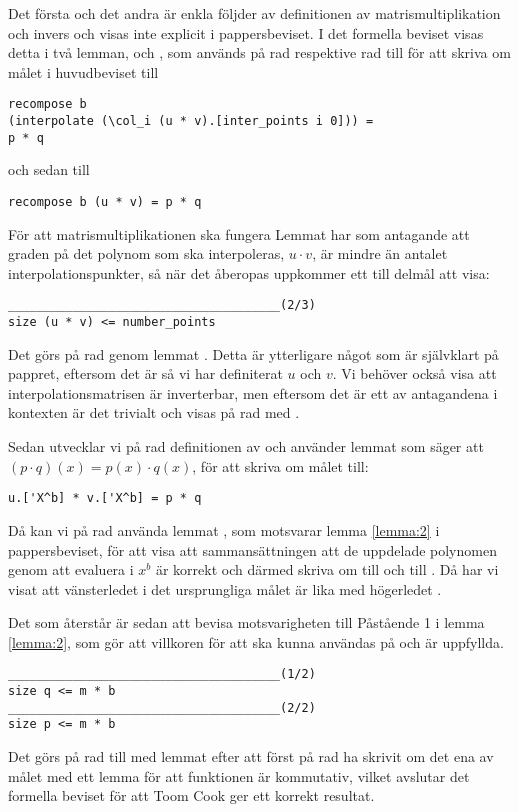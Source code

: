 Det första och det andra är enkla följder av definitionen av
matrismultiplikation och invers och visas inte explicit i pappersbeviset. I det
formella beviset visas detta i två lemman,  och
, som används på rad  respektive rad  till
 för att skriva om målet i huvudbeviset till
\begin{lstlisting}
recompose b
(interpolate (\col_i (u * v).[inter_points i 0])) =
p * q
\end{lstlisting}
och sedan till
\begin{lstlisting}
recompose b (u * v) = p * q
\end{lstlisting}
För att matrismultiplikationen ska fungera Lemmat  har
som antagande att graden på det polynom som ska interpoleras, $u \cdot v$, är
mindre än antalet interpolationspunkter, så när det åberopas uppkommer ett till
delmål att visa:
\begin{lstlisting}
______________________________________(2/3)
size (u * v) <= number_points
\end{lstlisting}
Det görs på rad  genom lemmat . Detta är
ytterligare något som är självklart på pappret, eftersom det är så vi har
definiterat $u$ och $v$. Vi behöver också visa att interpolationsmatrisen
 är inverterbar, men eftersom det är ett av antagandena i kontexten
är det trivialt och visas på rad  med \C{//}.

Sedan utvecklar vi på rad  definitionen av  och använder
lemmat  som säger att $(p \cdot q)(x) = p(x) \cdot q(x)$, för att
skriva om målet till:
\begin{lstlisting}
u.['X^b] * v.['X^b] = p * q
\end{lstlisting}
Då kan vi på rad  använda lemmat , som motsvarar lemma
\ref{lemma:2} i pappersbeviset, för att visa att sammansättningen att de
uppdelade polynomen genom att evaluera i $x^b$ är korrekt och därmed skriva om
 till  och  till . Då har vi visat att
vänsterledet i det ursprungliga målet är lika med högerledet .

Det som återstår är sedan att bevisa motsvarigheten till Påstående 1 i lemma
\ref{lemma:2}, som gör att villkoren för att  ska kunna
användas på  och  är uppfyllda.
\begin{lstlisting}
______________________________________(1/2)
size q <= m * b
______________________________________(2/2)
size p <= m * b
\end{lstlisting}
Det görs på rad  till  med lemmat  efter att först
på rad  ha skrivit om det ena av målet med ett lemma för att funktionen
 är kommutativ, vilket avslutar det formella beviset för att Toom
Cook ger ett korrekt resultat.

